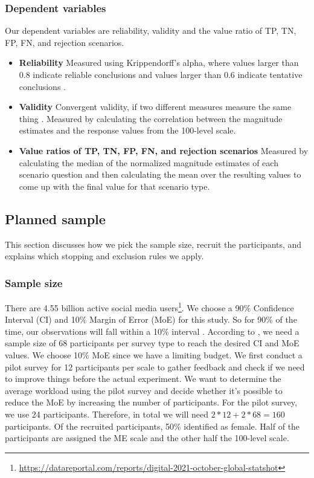\subsubsection{Dependent variables}
Our dependent variables are reliability, validity and the value ratio of TP, TN, FP, FN, and rejection scenarios.
%
\begin{itemize}
    \item \textbf{Reliability} Measured using Krippendorff's alpha, where values larger than 0.8 indicate reliable conclusions and values larger than 0.6 indicate tentative conclusions \citep{krippendorff2004reliability}.
    \item \textbf{Validity} Convergent validity, if two different measures measure the same thing \citep{fitzner2007reliability}. Measured by calculating the correlation between the magnitude estimates and the response values from the 100-level scale.
    \item \textbf{Value ratios of TP, TN, FP, FN, and rejection scenarios} Measured by calculating the median of the normalized magnitude estimates of each scenario question and then calculating the mean over the resulting values to come up with the final value for that scenario type.
\end{itemize}

\subsection{Planned sample}
This section discusses how we pick the sample size, recruit the participants, and explains which stopping and exclusion rules we apply.

\subsubsection{Sample size}
There are 4.55 billion active social media users\footnote{\url{https://datareportal.com/reports/digital-2021-october-global-statshot}}.
%
We choose a 90\% Confidence Interval (CI) and 10\% Margin of Error (MoE) for this study.
%
So for 90\% of the time, our observations will fall within a 10\% interval \citep{olson2014ways}.
%
According to \citet{olson2014ways}, we need a sample size of 68 participants per survey type to reach the desired CI and MoE values.
%
We choose 10\% MoE since we have a limiting budget.
%
We first conduct a pilot survey for 12 participants per scale to gather feedback and check if we need to improve things before the actual experiment.
%
We want to determine the average workload using the pilot survey and decide whether it's possible to reduce the MoE by increasing the number of participants.
%
For the pilot survey, we use 24 participants.
%
Therefore, in total we will need $2*12+2*68 = 160$ participants.
%
Of the recruited participants, 50\% identified as female.
%
Half of the participants are assigned the ME scale and the other half the 100-level scale.


